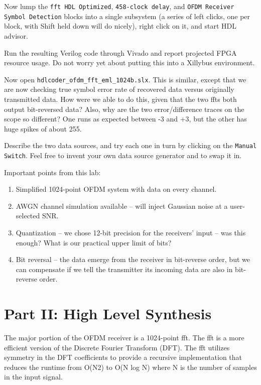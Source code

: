 Now lump the \texttt{\gls{fft} HDL Optimized}, \texttt{458-clock delay}, and \texttt{OFDM Receiver Symbol Detection} blocks into a single subsystem (a series of left clicks, one per block, with Shift held down will do nicely), right click on it, and start HDL advisor.
 
Run the resulting Verilog code through Vivado and report projected FPGA resource usage. Do not worry yet about putting this into a Xillybus environment.
 
Now open \texttt{hdlcoder\_ofdm\_fft\_eml\_1024b.slx}. This is similar, except that we are now checking true symbol error rate of recovered data versus originally transmitted data. How were we able to do this, given that the two \gls{fft}s both output bit-reversed data? Also, why are the two error/difference traces on the scope so different? One runs as expected between -3 and +3, but the other has huge spikes of about 255.
 
Describe the two data sources, and try each one in turn by clicking on the \texttt{Manual Switch}. Feel free to invent your own data source generator and to swap it in.  

Important points from this lab:
 
\begin{enumerate}
\item Simplified 1024-point OFDM system with data on every channel.
\item AWGN channel simulation available -- will inject Gaussian noise at a user-selected SNR.
\item Quantization -- we chose 12-bit precision for the receivers' input -- was this enough? What is our practical upper limit of bits? 
\item Bit reversal -- the data emerge from the receiver in bit-reverse order, but we can compensate if we tell the transmitter its incoming data are also in bit-reverse order.
\end{enumerate}

\section{Part II: High Level Synthesis}
The major portion of the OFDM receiver is a 1024-point \gls{fft}. The \gls{fft} is a more efficient version of the Discrete Fourier Transform (DFT). The \gls{fft} utilizes symmetry in the DFT coefficients to provide a recursive implementation that reduces the runtime from O(N2) to O(N log N) where N is the number of samples in the input signal. 

